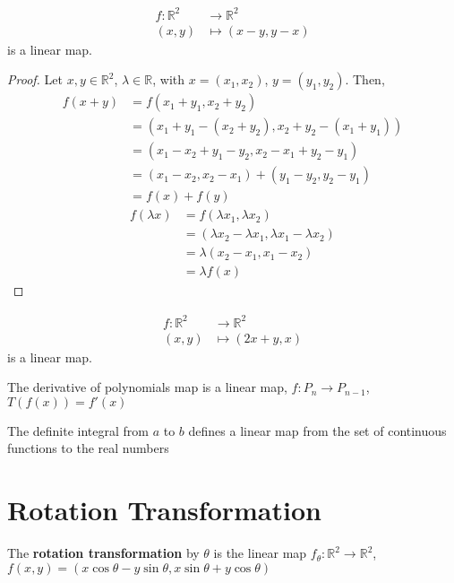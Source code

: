 \documentclass[letterpaper,12pt]{article}
\begin{document}
\begin{example}
\begin{align*}
    f: \mathbb{R}^2 & \longrightarrow \mathbb{R}^2 \\
    (x,y) & \longmapsto (x - y, y - x)
\end{align*}
is a linear map.
\end{example}
\begin{proof}
Let $x, y \in \mathbb{R}^2$, $\lambda \in \mathbb{R}$, with $x = (x_1, x_2)$, $y = (y_1, y_2)$. Then,
\begin{align*}
    f(x + y) & = f(x_1 + y_1, x_2 + y_2) \\
    & = (x_1 + y_1 - (x_2 + y_2), x_2 + y_2 - (x_1 + y_1)) \\
    & = (x_1 - x_2 + y_1 - y_2, x_2 - x_1 + y_2 - y_1) \\
    & = (x_1 - x_2, x_2 - x_1) + (y_1 - y_2, y_2 - y_1) \\
    & = f(x) + f(y)
\end{align*}
\begin{align*}
    f(\lambda x) & = f(\lambda x_1, \lambda x_2) \\
    & = (\lambda x_2 - \lambda x_1, \lambda x_1 - \lambda x_2) \\
    & = \lambda (x_2 - x_1, x_1 - x_2) \\
    & = \lambda f(x)
\end{align*}
\end{proof}

\begin{example}
\begin{align*}
    f: \mathbb{R}^2 & \longrightarrow \mathbb{R}^2 \\
    (x,y) & \longmapsto (2x + y, x)
\end{align*}
is a linear map.
\end{example}

\begin{example}
The derivative of polynomials map is a linear map, $f: P_n \rightarrow P_{n-1}$, $T(f(x)) = f'(x)$
\end{example}

\begin{example}
The definite integral from $a$ to $b$ defines a linear map from the set of continuous functions to the real numbers
\end{example}

\section*{Rotation Transformation}
\begin{theorem}
The \textbf{rotation transformation} by $\theta$ is the linear map $f_{\theta}: \mathbb{R}^2 \rightarrow \mathbb{R}^2$, $f(x,y) = (x \cos{\theta} - y \sin{\theta}, x \sin{\theta} + y \cos{\theta})$
\end{theorem}
\end{document}
